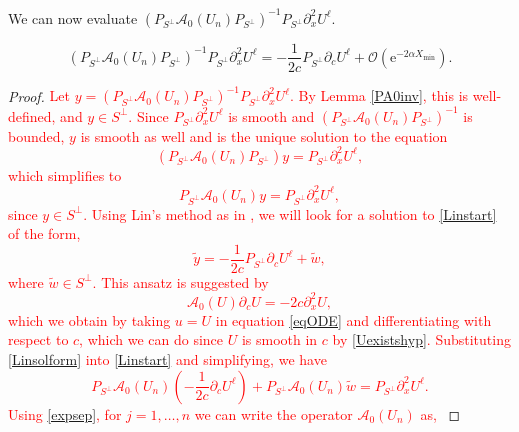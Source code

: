 \documentclass[review,onefignum,onetabnum]{siamart171218}
\newcommand{\rme}{\mathrm{e}}
\newcommand{\calA}{\mathcal{A}}
\newcommand{\revised}[1]{ \textcolor{red}{#1} }
\begin{document}
We can now evaluate $(P_{S^\perp} \calA_0(U_n) P_{S^\perp})^{-1} P_{S^\perp}\partial_x^2U^\ell$.


\begin{lemma}\label{PA0invqxx}
\begin{equation}\label{invqxx}
(P_{S^\perp} \calA_0(U_n)P_{S^\perp})^{-1} P_{S^\perp}\partial_x^2U^\ell = -\frac{1}{2c}P_{S^\perp}\partial_cU^\ell
+ \mathcal{O}(\rme^{-2 \alpha X_{\mathrm{min}}}).
\end{equation}
\end{lemma}

\begin{proof}
\revised{
Let $y = (P_{S^\perp} \calA_0(U_n)P_{S^\perp})^{-1} P_{S^\perp}\partial_x^2U^\ell$. By Lemma \ref{PA0inv}, this is well-defined, and $y \in S^\perp$. Since $P_{S^\perp}\partial_x^2U^\ell$ is smooth and $(P_{S^\perp} \calA_0(U_n)P_{S^\perp})^{-1}$ is bounded, $y$ is smooth as well and is the unique solution to the equation
\begin{equation*}
(P_{S^\perp} \calA_0(U_n) P_{S^\perp})y = P_{S^\perp}\partial_x^2U^\ell,
\end{equation*}
which simplifies to
\begin{equation}\label{Linstart}
P_{S^\perp} \calA_0(U_n) y = P_{S^\perp}\partial_x^2U^\ell,
\end{equation}
since $y \in S^\perp$. Using Lin's method as in \cite{sandstede:som98}, we will look for a solution to \cref{Linstart} of the form,
\begin{equation}\label{Linsolform}
\tilde{y} = -\frac{1}{2c} P_{S^\perp}\partial_cU^\ell + \tilde{w},
\end{equation}
where $\tilde{w} \in S^\perp$. This ansatz is suggested by
\begin{equation}\label{uc}
\calA_0(U) \partial_c U = -2 c\partial_x^2 U,
\end{equation}
which we obtain by taking $u = U$ in equation \cref{eqODE} and differentiating with respect to $c$, which we can do since $U$ is smooth in $c$ by \cref{Uexistshyp}. Substituting \cref{Linsolform} into \cref{Linstart} and simplifying, we have
\begin{equation}\label{Lin2}
P_{S^\perp} \calA_0(U_n) \left(-\frac{1}{2c} \partial_cU^\ell \right) + P_{S^\perp} \calA_0(U_n) \tilde{w} = P_{S^\perp}\partial_x^2U^\ell.
\end{equation}
Using \cref{expsep}, for $j = 1, \dots, n$ we can write the operator $\calA_0(U_n)$ as,
}
\end{proof}
\end{document}
